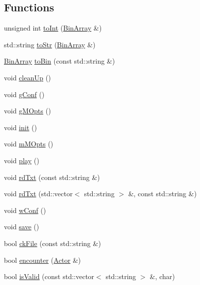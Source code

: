 \subsection*{Functions}
\begin{DoxyCompactItemize}
\item 
unsigned int \hyperlink{namespace_flow_a3fe28a3ba61421c4d80f942102b9bfdc}{to\+Int} (\hyperlink{class_flow_1_1_bin_array}{Bin\+Array} \&)
\item 
std\+::string \hyperlink{namespace_flow_aecdc302d3189de5ec98c40317efedc62}{to\+Str} (\hyperlink{class_flow_1_1_bin_array}{Bin\+Array} \&)
\item 
\hyperlink{class_flow_1_1_bin_array}{Bin\+Array} \hyperlink{namespace_flow_a731bdae4bdf6527208f0a8bc3b2ab609}{to\+Bin} (const std\+::string \&)
\item 
void \hyperlink{namespace_flow_aa61423790cc3ea1eb33e45bb4596042a}{clean\+Up} ()
\item 
void \hyperlink{namespace_flow_a37add817bd1f0f674074844aa9c71a03}{g\+Conf} ()
\item 
void \hyperlink{namespace_flow_a0dffd1ca59d045eb50e9cb6cb48601bd}{g\+M\+Opts} ()
\item 
void \hyperlink{namespace_flow_af89b31b06a629493e8b9d3797d618361}{init} ()
\item 
void \hyperlink{namespace_flow_a0809d9a60d22a2867e9d3ffa2a7ab9bc}{m\+M\+Opts} ()
\item 
void \hyperlink{namespace_flow_a99dd7c10b5db12f296dc3a25313206da}{play} ()
\item 
void \hyperlink{namespace_flow_a652e3e72e118566969bd80c132bd4964}{rd\+Txt} (const std\+::string \&)
\item 
void \hyperlink{namespace_flow_a425f80ed9b32235f33d7f38cc7798386}{rd\+Txt} (std\+::vector$<$ std\+::string $>$ \&, const std\+::string \&)
\item 
void \hyperlink{namespace_flow_a2d6d85749fd0dd65654b3682ad46b760}{w\+Conf} ()
\item 
void \hyperlink{namespace_flow_a18b4909edf24f2acafecf40e42016f98}{save} ()
\item 
bool \hyperlink{namespace_flow_ac0d6ec00171135acca42eea277c889a1}{ck\+File} (const std\+::string \&)
\item 
bool \hyperlink{namespace_flow_a43e74dfbdf28d1c009d3601ac1ca3cfd}{encounter} (\hyperlink{class_flow_1_1_actor}{Actor} \&)
\item 
bool \hyperlink{namespace_flow_ae1a1cbd4b8bf306ff4ca29275af27bf1}{is\+Valid} (const std\+::vector$<$ std\+::string $>$ \&, char)

\end{DoxyCompactItemize}
